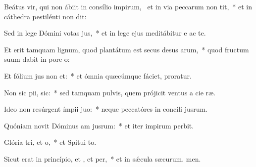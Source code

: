 \item Beátus vir, qui non ábiit in consílio impirum,~\pscross{} et in via peccarum non tit,~* et in cáthedra pestilénti non dit:
\item Sed in lege Dómini votas jus,~* et in lege ejus meditábitur e ac te.
\item Et erit tamquam lignum, quod plantátum est secus desus arum,~* quod fructum suum dabit in pore o:
\item Et fólium jus non et:~* et ómnia quæcúmque fáciet, proratur.
\item Non sic pii,  sic:~* sed tamquam pulvis, quem prójicit ventus a cie ræ.
\item Ideo non resúrgent ímpii  juo:~* neque peccatóres in concíli jusrum.
\item Quóniam novit Dóminus am jusrum:~* et iter impirum perbit.
\item Glória tri, et o,~* et Spitui to.
\item Sicut erat in princípio, et , et per,~* et in sǽcula sæcurum. men.
